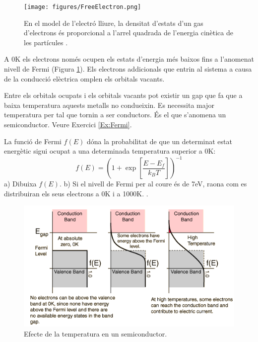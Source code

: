 \begin{figure}[h]
\centering
\texttt{[image: figures/FreeElectron.png]}
\caption[Model de l'electró lliure]{En el model de l'electró lliure, la densitat d'estats d'un gas d'electrons és proporcional a l'arrel quadrada de l'energia cinètica de les partícules \cite{Yen2008}. }
\label{fig:FreeElectron}
\end{figure}

A 0K els electrons només ocupen els estats d'energia més baixos fins a l'anomenat nivell de Fermi (Figura \ref{fig:FreeElectron}). Els electrons addicionals que entrin al sistema a causa de la conducció elèctrica omplen els orbitals vacants.

Entre els orbitals ocupats i els orbitals vacants pot existir un gap que fa que a baixa temperatura aquests metalls no condueixin. Es necessita major temperatura per tal que tornin a ser conductors. 
És el que s'anomena un semiconductor. Veure Exercici \ref{Ex:Fermi}.

\begin{exr}
La funció de Fermi $f(E)$ dóna la probabilitat de que un determinat estat energètic sigui ocupat a una determinada temperatura superior a 0K:
\[f(E)=\left( 1 + \exp \left[ \frac{E-E_f}{k_B T} \right] \right)^{-1}\]
a) Dibuixa $f(E)$. b) Si el nivell de Fermi per al coure és de 7eV, raona com es distribuiran els seus electrons a 0K i a 1000K.
\label{Ex:Fermi}.
\end{exr}

\begin{figure}[h]
\centering
\includegraphics[scale=0.7]{figures/FermiBand.png}
\caption{Efecte de la temperatura en un semiconductor.}
\label{fig:FermiBand}
\end{figure}

